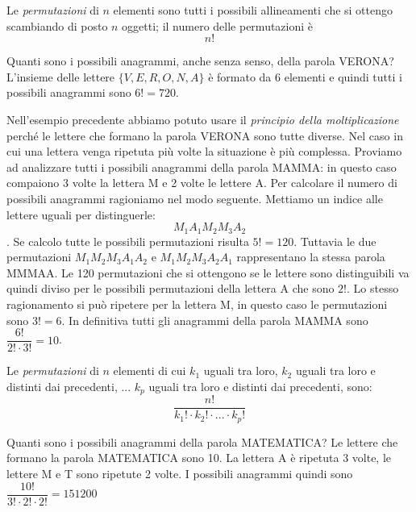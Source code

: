 \begin{definizione}
Le \emph{permutazioni} di $n$ elementi sono tutti i possibili allineamenti che si ottengo scambiando di posto $n$ oggetti; il numero delle permutazioni è
$$n!$$
\end{definizione}
\begin{exrig}
\begin{esempio}
Quanti sono i possibili anagrammi, anche senza senso, della parola VERONA?
L'insieme delle lettere $\{V,E,R,O,N,A\}$ è formato da 6 elementi e quindi tutti i possibili anagrammi sono $6!=720$.
\end{esempio}
\end{exrig}

Nell'esempio precedente abbiamo potuto usare il \emph{principio della moltiplicazione} perché le lettere che formano la parola VERONA sono tutte diverse. Nel caso in cui una lettera venga ripetuta più volte la situazione è più complessa.
Proviamo ad analizzare tutti i possibili anagrammi della parola MAMMA: in questo caso compaiono 3 volte la lettera M e 2 volte le lettere A. Per calcolare il numero di possibili anagrammi ragioniamo nel modo seguente. Mettiamo un indice alle lettere uguali per distinguerle:
$$M_1 A_1 M_2 M_3 A_2$$.
Se calcolo tutte le possibili permutazioni risulta $5!=120$. Tuttavia le due permutazioni $M_1 M_2 M_3 A_1 A_2$ e $M_1 M_2 M_3 A_2 A_1$ rappresentano la stessa parola MMMAA. Le 120 permutazioni che si ottengono se le lettere sono distinguibili va quindi diviso per le possibili permutazioni della lettera A che sono $2!$. Lo stesso ragionamento si può ripetere per la lettera M, in questo caso le permutazioni sono $3!=6$. In definitiva tutti gli anagrammi della parola MAMMA sono
$\dfrac{6!}{2!\cdot 3!}=10$.

\begin{definizione}
Le \emph{permutazioni} di $n$ elementi di cui $k_1$ uguali tra loro, $k_2$ uguali tra loro e distinti dai precedenti, ... $k_p$ uguali tra loro e distinti dai precedenti, sono:
$$ \dfrac{n!}{k_1!\cdot k_2! \cdot ... \cdot k_p!}$$
\end{definizione}

\begin{esempio}
Quanti sono i possibili anagrammi della parola MATEMATICA?
Le lettere che formano la parola MATEMATICA sono 10. La lettera A è ripetuta 3 volte, le lettere M e T sono ripetute 2 volte. I possibili anagrammi quindi sono
$\dfrac{10!}{3!\cdot 2!\cdot 2!}=151200$
\end{esempio}


